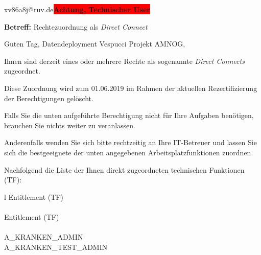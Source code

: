 \documentclass[a4paper,landscape,12pt]{letter}
\begin{document}
\begin{letter}{xv86a8j@ruv.de\space\space\space\space\space\space\space\space\space\bfseries\colorbox{red}{Achtung, Technischer User}\hfill \break}
\begin{normalsize}
	\opening{\textbf{Betreff:} Rechtezuordnung als \emph{Direct Connect}}
	\begin{normalsize} \hfill
	\end{normalsize}

	\begin{normalsize}
		Guten Tag, 
	Datendeployment Vespucci Projekt AMNOG, \hfill \break
	\end{normalsize}
	\end{normalsize}
	
\begin{normalsize}
	Ihnen sind derzeit eines oder mehrere Rechte als sogenannte \emph{Direct Connects} zugeordnet.
	
	Diese Zuordnung wird zum 01.06.2019 im Rahmen der aktuellen Rezertifizierung der Berechtigungen gelöscht.
	
	Falls Sie die unten aufgeführte Berechtigung nicht für Ihre Aufgaben benötigen, 
	brauchen Sie nichts weiter zu veranlassen.
	
	Anderenfalls wenden Sie sich bitte rechtzeitig an Ihre IT-Betreuer 
	und lassen Sie sich die bestgeeignete der unten angegebenen Arbeitsplatzfunktionen zuordnen.
	\end{normalsize}
	
\begin{normalsize}
	Nachfolgend die Liste der Ihnen direkt zugeordneten technischen Funktionen (TF):

	\begin{longtable}{l}
		Entitlement (TF) \\ \hline
		\endfirsthead
		\\\hline
		Entitlement (TF) \\ \hline
		\endhead %
		\multicolumn{1}{r@{}}{Fortsetzung \ldots}\\
		\endfoot
		\hline
		\endlastfoot
	A\_KRANKEN\_ADMIN\\A\_KRANKEN\_TEST\_ADMIN\\
	\end{longtable}
	\end{normalsize}
	

\end{letter}
\end{document}
